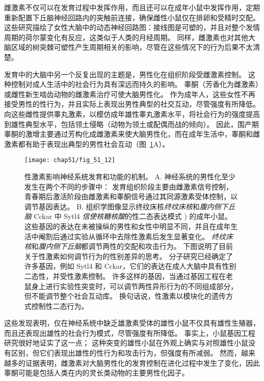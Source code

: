 雌激素不仅可以在发育过程中发挥作用，而且还可以在成年小鼠中发挥作用，定期重新配置下丘脑神经回路内的突触前连接，确保雌性小鼠仅在排卵和受精时交配。
这些研究描绘了女性大脑中的动态神经回路图：接线图是可塑的，并且对整个发情周期的荷尔蒙变化有反应，这类似于人类的月经周期。
同样，雌激素也对其他大脑区域的树突棘可塑性产生周期相关的影响，尽管在这些情况下的行为后果不太清楚。


发育中的大脑中另一个反复出现的主题是，男性化在组织阶段受雌激素控制。
这种控制对成人生活中的社会行为具有深远而持久的影响。
睾酮（芳香化为雌激素）或雌性新生啮齿动物的雌激素治疗可使大脑男性化。
作为成年人，这些女性不再接受男性的性行为，并且实际上表现出男性典型的社交互动，尽管强度有所降低。
向这些雌性提供睾丸激素，以模仿成年雄性睾丸激素水平，将社会行为的强度提高到雄性典型水平，包括领土侵略（动物为领土或配偶而战的倾向）。
因此，围产期睾酮的激增主要通过芳构化成雌激素来使大脑男性化，而在成年生活中，睾酮和雌激素都有助于表现出典型的男性社会互动（图~\ref{fig:51_12}A）。


\begin{figure}[htbp]
	\centering
	\texttt{[image: chap51/fig\_51\_12]}
	\caption{性激素影响神经系统发育和功能的机制。
		A. 神经系统的男性化至少发生在两个不同的步骤中：
		发育组织阶段主要由雌激素信号控制，青春期后激活阶段由雌激素和睾酮信号通过其同源激素受体控制，以调节基因表达。
		B. 组织学图像显示终纹床核\textit{终纹床核}和\textit{腹内侧下丘脑} Cckar 中 Sytl4 \textit{信使核糖核酸}的性二态表达模式 ) 的成年小鼠。
		这些基因的表达在未被操纵的男性和女性中明显不同，并且在成年生活中阉割后通过实验从循环中去除性激素后发生显著变化。
		\textit{终纹床核}和\textit{腹内侧下丘脑}都调节两性的交配和攻击行为。
		下图说明了目前关于性激素如何调节行为的性别差异的思考。
		分子研究已经确定了许多基因，例如 Sytl4 和 Cckar，它们的表达在成人大脑中具有性别二态性，并受性激素控制。
		许多这样的基因，当通过基因工程在老鼠身上进行实验性突变时，可以调节两性异形行为的不同组成部分，但不能调节整个社会互动库。
		换句话说，性激素以模块化的遗传方式控制性二态行为\cite{xu2012modular}。}
	\label{fig:51_12}
\end{figure}


这些发现表明，仅在神经系统中缺乏雄激素受体的雄性小鼠不仅具有雄性生殖器，而且还表现出雄性的社会行为模式，尽管强度有所降低。
事实上，小鼠基因工程研究很好地证实了这一点；
这种突变的雄性小鼠在外观上确实与对照雄性小鼠没有区别，但它们表现出雄性的性行为和攻击行为，但强度有所减弱。
然而，越来越多的证据表明，雌激素对大脑男性化的发育控制在进化过程中发生了变化，因此睾酮可能是包括人类在内的灵长类动物的主要男性化因子。



